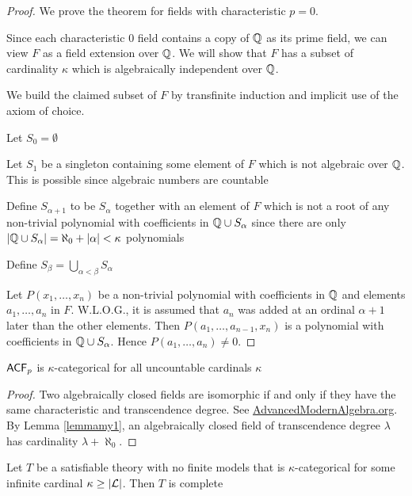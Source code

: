 \documentclass[11pt]{article}
\begin{document}
\begin{proof}
We prove the theorem for fields with characteristic \(p=0\). 

Since each characteristic 0 field contains a copy of \(\mathbb{Q}\) as its prime
field, we can view \(F\) as a field extension over \(\mathbb{Q}\). We will show that
\(F\) has a subset of cardinality \(\kappa\) which is algebraically independent over
\(\mathbb{Q}\).

We build the claimed subset of \(F\) by transfinite induction and implicit use
of the axiom of choice.

Let \(S_0=\emptyset\)

Let \(S_1\) be a singleton containing some element of \(F\) which is not
algebraic over \(\mathbb{Q}\). This is possible since algebraic numbers are countable

Define \(S_{\alpha+1}\) to be \(S_\alpha\) together with an element of \(F\)
which is not a root of any non-trivial polynomial with coefficients in 
\(\mathbb{Q}\cup S_\alpha\) since there are only 
\(\abs{\Q\cup S_\alpha}=\aleph_0+\abs{\alpha}<\kappa\) polynomials

Define \(S_\beta=\displaystyle\bigcup_{\alpha<\beta}S_\alpha\)

Let \(P(x_1,\dots,x_n)\) be a non-trivial polynomial with coefficients in
\(\mathbb{Q}\) and elements \(a_1,\dots,a_n\) in \(F\). W.L.O.G., it is assumed that
\(a_n\) was added at an ordinal \(\alpha+1\) later than the other elements.
Then \(P(a_1,\dots,a_{n-1},x_n)\) is a polynomial with coefficients in 
\(\mathbb{Q}\cup S_\alpha\). Hence \(P(a_1,\dots,a_n)\neq0\).
\end{proof}

\begin{proposition}[]
\label{prop2.2.5}
\(\textsf{ACF}_p\) is \(\kappa\)-categorical for all uncountable cardinals \(\kappa\)
\end{proposition}

\begin{proof}
Two algebraically closed fields are isomorphic if and only if they have the
same characteristic and transcendence degree. See
\url{AdvancedModernAlgebra.org}. By Lemma
\ref{lemmamy1}, an algebraically closed field of transcendence degree \(\lambda\) has
cardinality \(\lambda+\aleph_0\).
\end{proof}

\begin{theorem}
\label{thm2.2.6}
Let \(T\) be a satisfiable theory with no finite models that is
\(\kappa\)-categorical for some infinite cardinal \(\kappa\ge\abs{\call}\). Then
\(T\) is complete
\end{theorem}
\end{document}
